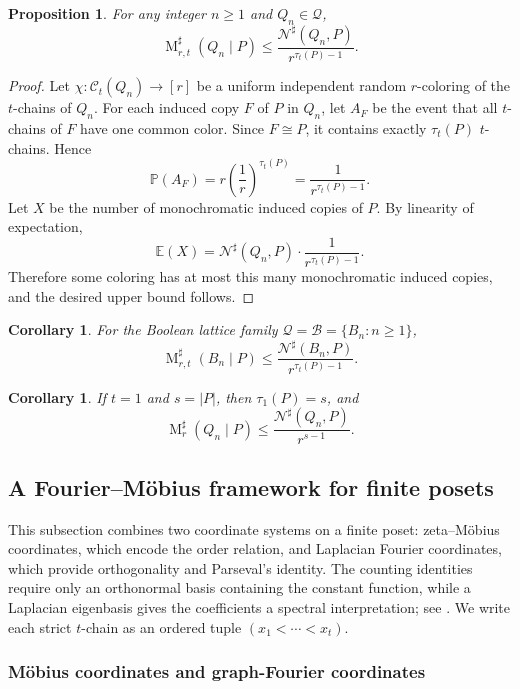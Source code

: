 \documentclass[twoside,12pt]{article}
\newtheorem{corollary}[theorem]{Corollary}
\newtheorem{proposition}{Proposition}[section]
\begin{document}
\begin{proposition}\label{pro-UUB}
For any integer $n\geq1$ and $Q_n\in\mathcal Q$,
\[
\operatorname M_{r,t}^\sharp(Q_n\mid P)
\leq\frac{\mathcal N^\sharp(Q_n,P)}{r^{\tau_t(P)-1}}.
\]
\end{proposition}

\begin{proof}
Let $\chi:\mathcal C_t(Q_n)\to[r]$ be a uniform independent random $r$-coloring of the $t$-chains of $Q_n$. For each induced copy $F$ of $P$ in $Q_n$, let $A_F$ be the event that all $t$-chains of $F$ have one common color. Since $F\cong P$, it contains exactly $\tau_t(P)$ $t$-chains. Hence
\[
\mathbb P(A_F)=r\left(\frac1r\right)^{\tau_t(P)}=\frac1{r^{\tau_t(P)-1}}.
\]
Let $X$ be the number of monochromatic induced copies of $P$. By linearity of expectation,
\[
\mathbb E (X)=\mathcal N^\sharp(Q_n,P)\cdot\frac1{r^{\tau_t(P)-1}}.
\]
Therefore some coloring has at most this many monochromatic induced copies, and the desired upper bound follows.
\end{proof}

\begin{corollary}
For the Boolean lattice family $\mathcal Q=\mathcal B=\{B_n:n\geq1\}$,
\[
\operatorname M_{r,t}^\sharp(B_n\mid P)
\leq\frac{\mathcal N^\sharp(B_n,P)}{r^{\tau_t(P)-1}}.
\]
\end{corollary}

\begin{corollary}
If $t=1$ and $s=|P|$, then $\tau_1(P)=s$, and
\[
\operatorname M_r^\sharp(Q_n\mid P)
\leq\frac{\mathcal N^\sharp(Q_n,P)}{r^{s-1}}.
\]
\end{corollary}


\subsection{A Fourier--M\"obius framework for finite posets}\label{sec:fourier-posets}
This subsection combines two coordinate systems on a finite poset: zeta--M\"obius
coordinates, which encode the order relation, and Laplacian Fourier
coordinates, which provide orthogonality and Parseval's identity. The counting identities require
only an orthonormal basis containing the constant function, while a Laplacian
eigenbasis gives the coefficients a spectral interpretation; see
\cite{Chung97,ODonnell14,StanleyEC1}.
We write each strict \(t\)-chain as an ordered tuple
\((x_1<\cdots<x_t)\).

\subsubsection{M\"obius coordinates and graph-Fourier coordinates}
\end{document}
